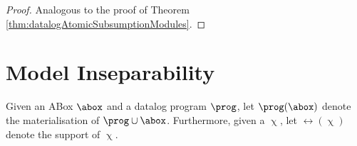 \datalogClassifModules*
\begin{proof}
Analogous to the proof of Theorem \ref{thm:datalogAtomicSubsumptionModules}.
\end{proof}










\section{Model Inseparability}

Given an ABox $\abox$ and a datalog program $\prog$, let $\prog(\abox)$ denote the
materialisation of $\prog\cup\abox$. 
Furthermore, given a \bla{} $\upchi$, let $\rel(\upchi)$
denote the support of $\upchi$.

